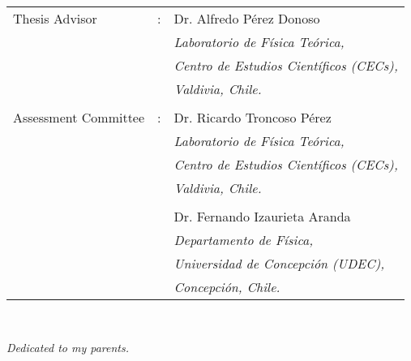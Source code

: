 \documentclass[letterpaper,11pt,oneside]{book}
\begin{document}
\newpage
\frontmatter
\setcounter{page}{1}
\thispagestyle{empty}
\ \\
\vspace{10cm}

\begin{large}
\hspace{1.5cm}\begin{tabular}[c]{lll}
Thesis Advisor & : & Dr. Alfredo P\'erez Donoso \\
& & {\normalsize \textit{Laboratorio de F\'isica Te\'orica,}} \\ 
& & {\normalsize \textit{Centro de Estudios Cient\'ificos (CECs),}} \\
& & \textit{Valdivia, Chile.} \\ \\
Assessment Committee & : & Dr. Ricardo Troncoso Pérez \\
& & {\normalsize \textit{Laboratorio de F\'isica Te\'orica,}} \\ 
& & {\normalsize \textit{Centro de Estudios Cient\'ificos (CECs),}} \\ 
& & \textit{Valdivia, Chile.} \\ \\
& & Dr. Fernando Izaurieta Aranda \\
& & {\normalsize \textit{Departamento de F\'isica,}} \\ 
& & {\normalsize \textit{Universidad de Concepci\'on (UDEC),}} \\
& & \textit{Concepci\'on, Chile.} 
\end{tabular}
\end{large}

\newpage


\newpage

\thispagestyle{empty}
\ \\
\vspace{13cm}

\begin{flushright}
	{\Large {\it Dedicated to my parents. }}
\end{flushright}


\afterpage{\null\newpage}

\doublespacing
\thispagestyle{plain}
\end{document}

